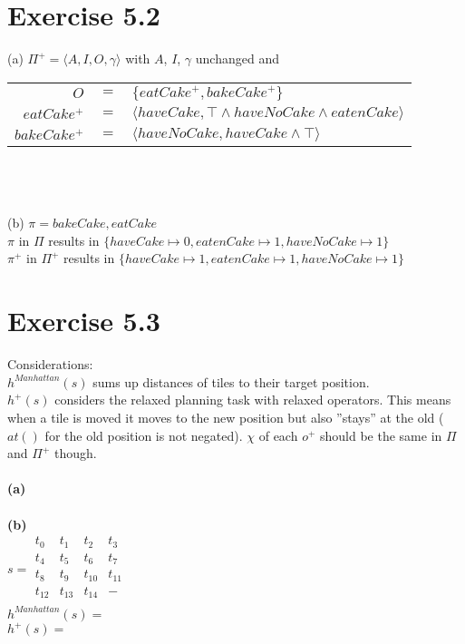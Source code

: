 \documentclass[11pt,a4paper]{article}
\begin{document}
\section*{Exercise 5.2}
(a) $\Pi^+ = \langle A,I,O,\gamma \rangle$ with $A$, $I$, $\gamma$ unchanged and\\
\begin{tabular}{rcl}
$O$ & $=$ & $\{eatCake^+,bakeCake^+\}$\\
$eatCake^+$ & $=$ & $\langle haveCake, \top \land haveNoCake \land eatenCake\rangle$\\
$bakeCake^+$ & $=$ & $\langle haveNoCake, haveCake \land \top \rangle$\\
\end{tabular}\\
\\
\\
(b) $\pi = bakeCake, eatCake$\\
$\pi$ in $\Pi$ results in $\{haveCake \mapsto 0, eatenCake \mapsto 1, haveNoCake \mapsto 1\}$\\
$\pi^+$ in $\Pi^+$ results in $\{haveCake \mapsto 1, eatenCake \mapsto 1, haveNoCake \mapsto 1\}$\\

\section*{Exercise 5.3}
Considerations:\\
$h^{Manhattan}(s)$ sums up distances of tiles to their target position.\\
$h^+(s)$ considers the relaxed planning task with relaxed operators. This means when a tile is moved it moves to the new position but also ''stays'' at the old ($at()$ for the old position is not negated). $\chi$ of each $o^+$ should be the same in $\Pi$ and $\Pi^+$ though.\\
\\
\textbf{(a)}\\
\\
\textbf{(b)}\\
$s = \begin{matrix}
t_0 & t_1 & t_2 & t_3 \\
t_4 & t_5 & t_6 & t_7 \\
t_8 & t_9 & t_{10} & t_{11} \\
t_{12} & t_{13} & t_{14} & - \\ %
\end{matrix}$\\
$h^{Manhattan}(s)=$\\
$h^+(s)=$
\end{document}
